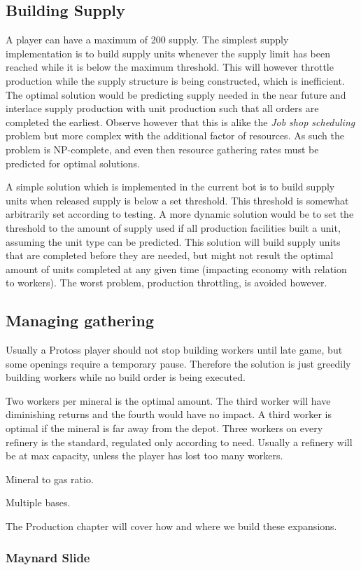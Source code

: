 	\subsection*{Building Supply}
	A player can have a maximum of 200 supply. The simplest supply implementation is to build supply units whenever the supply limit has been reached while it is below the maximum threshold. This will however throttle production while the supply structure is being constructed, which is inefficient. The optimal solution would be predicting supply needed in the near future and interlace supply production with unit production such that all orders are completed the earliest. Observe however that this is alike the \emph{Job shop scheduling} problem but more complex with the additional factor of resources. As such the problem is NP-complete, and even then resource gathering rates must be predicted for optimal solutions.
	
	A simple solution which is implemented in the current bot is to build supply units when released supply is below a set threshold. This threshold is somewhat arbitrarily set according to testing. A more dynamic solution would be to set the threshold to the amount of supply used if all production facilities built a unit, assuming the unit type can be predicted. This solution will build supply units that are completed before they are needed, but might not result the optimal amount of units completed at any given time (impacting economy with relation to workers). The worst problem, production throttling, is avoided however.

	\subsection*{Managing gathering}
	Usually a Protoss player should not stop building workers until late game, but some openings require a temporary pause. Therefore the solution is just greedily building workers while no build order is being executed.
	
	Two workers per mineral is the optimal amount. The third worker will have diminishing returns and the fourth would have no impact. A third worker is optimal if the mineral is far away from the depot. Three workers on every refinery is the standard, regulated only according to need. Usually a refinery will be at max capacity, unless the player has lost too many workers.
	
	Mineral to gas ratio.
	
	Multiple bases.

	The Production chapter will cover how and where we build these expansions.

	\subsubsection*{Maynard Slide}